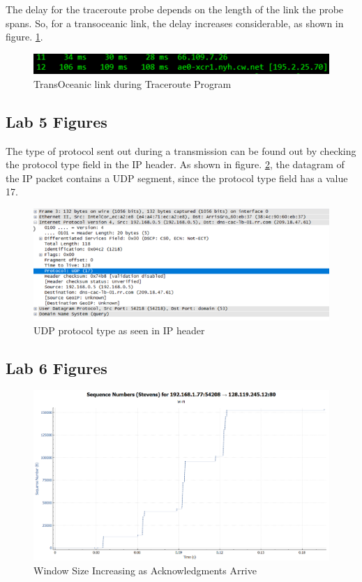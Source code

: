 \documentclass[10pt]{IEEEtran}
\begin{document}
\begin{appendix}
The delay for the traceroute probe depends on the length of the link the probe spans. So, for a transoceanic link, the delay increases considerable, as shown in figure. \ref{fig:transoceanic}.

\begin{figure}[h!]
	\includegraphics[width=\linewidth]{transoceanic.png}
	\caption{TransOceanic link during Traceroute Program}
    \label{fig:transoceanic}
\end{figure}

\subsection{Lab 5 Figures}
The type of protocol sent out during a transmission can be found out by checking the protocol type field in the IP header. As shown in figure. \ref{fig:udp_pro_type}, the datagram of the IP packet contains a UDP segment, since the protocol type field has a value 17.  

\begin{figure}[h!]
	\includegraphics[width=\linewidth]{udp_pro_type.PNG}
	\caption{UDP protocol type as seen in IP header}
	\label{fig:udp_pro_type}
\end{figure}


\subsection{Lab 6 Figures}

\begin{figure}[h!]
	\includegraphics[width=\linewidth]{increasingwindow.png}
	\caption{Window Size Increasing as Acknowledgments Arrive}
	\label{fig:increasingwindow}
\end{figure}


\end{appendix}
\end{document}
